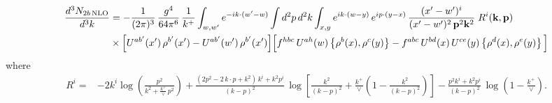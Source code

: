 \documentclass[9pt]{article}
\numberwithin{equation}{section}
\begin{document}
\begin{align}
\frac{d^{3}N_{2b\,\rm NLO}}{d^{3}k} & = -\frac{1}{(2\pi)^{3}}\,\frac{g^{4}}{64\pi^{6}}\,\frac{1}{k^{+}}\int_{w,w'} e^{-ik\cdot(w'-w)}
\int d^{2}p\,d^{2}k\int_{x,y} e^{ik\cdot(w-y)}\,e^{ip\cdot(y-x)}\,\frac{(x'-w')^{i}}{(x'-w')^{2}\,\mathbf{p}^{2}\mathbf{k}^{2}}\;R^{i}(\mathbf{k},\mathbf{p})\notag\\
&\times\Big[U^{ab'}(x')\,\rho^{b'}(x')-U^{ab'}(w')\,\rho^{b'}(x')\Big]
\Big[f^{hbc}\,U^{ah}(w)\left\{\rho^{b}(x),\rho^{c}(y)\right\}-f^{abc}\,U^{bd}(x)\,U^{ce}(y)\left\{\rho^{d}(x),\rho^{e}(y)\right\}\Big]
\end{align}
where
\begin{align}
R^{i} =& -2k^{i}\log\left(\frac{p^{2}}{k^{2}+\frac{k^{+}}{\vee}\,p^{2}}\right)
+\frac{(2p^{2}-2\,k\cdot p+k^{2})\,k^{i}+k^{2}p^{i}}{(k-p)^{2}}\,
\log\left[\frac{k^{2}}{(k-p)^{2}}+\frac{k^{+}}{\vee}\left(1-\frac{k^{2}}{(k-p)^{2}}\right)\right]
-\frac{p^{2}k^{i}+k^{2}p^{i}}{(k-p)^{2}}\,\log\left(1-\frac{k^{+}}{\vee}\right).
\end{align}
\end{document}
